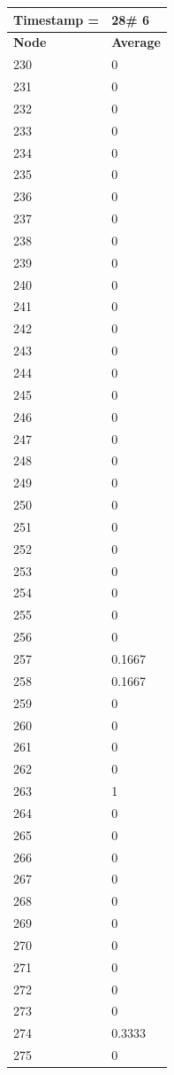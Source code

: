 \begin{tabular}{|l||l|}
\hline
\textbf{Timestamp =} & \textbf{28}\# 6\\\hline
	\textbf{Node} & \textbf{Average} \\ \hline
\hline
	230 & 0 \\ \hline
	231 & 0 \\ \hline
	232 & 0 \\ \hline
	233 & 0 \\ \hline
	234 & 0 \\ \hline
	235 & 0 \\ \hline
	236 & 0 \\ \hline
	237 & 0 \\ \hline
	238 & 0 \\ \hline
	239 & 0 \\ \hline
	240 & 0 \\ \hline
	241 & 0 \\ \hline
	242 & 0 \\ \hline
	243 & 0 \\ \hline
	244 & 0 \\ \hline
	245 & 0 \\ \hline
	246 & 0 \\ \hline
	247 & 0 \\ \hline
	248 & 0 \\ \hline
	249 & 0 \\ \hline
	250 & 0 \\ \hline
	251 & 0 \\ \hline
	252 & 0 \\ \hline
	253 & 0 \\ \hline
	254 & 0 \\ \hline
	255 & 0 \\ \hline
	256 & 0 \\ \hline
	257 & 0.1667 \\ \hline
	258 & 0.1667 \\ \hline
	259 & 0 \\ \hline
	260 & 0 \\ \hline
	261 & 0 \\ \hline
	262 & 0 \\ \hline
	263 & 1 \\ \hline
	264 & 0 \\ \hline
	265 & 0 \\ \hline
	266 & 0 \\ \hline
	267 & 0 \\ \hline
	268 & 0 \\ \hline
	269 & 0 \\ \hline
	270 & 0 \\ \hline
	271 & 0 \\ \hline
	272 & 0 \\ \hline
	273 & 0 \\ \hline
	274 & 0.3333 \\ \hline
	275 & 0 \\ \hline
\end{tabular}

